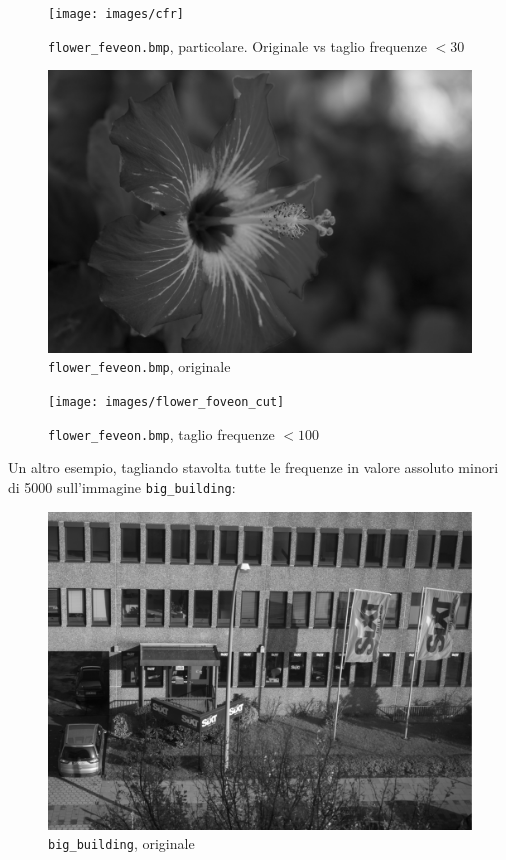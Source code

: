 \documentclass[11pt,a4paper]{scrartcl}
\begin{document}
\begin{figure}[!ht]
\centering
\texttt{[image: images/cfr]} 
\caption{\texttt{flower\_feveon.bmp}, particolare. Originale vs taglio frequenze $< 30$}
\end{figure}

\begin{figure}[!ht]
\centering
\includegraphics[scale=0.29]{images/flower_foveon} 
\caption{\texttt{flower\_feveon.bmp}, originale}
\end{figure}

\begin{figure}[!ht]
\centering
\texttt{[image: images/flower\_foveon\_cut]} 
\caption{\texttt{flower\_feveon.bmp}, taglio frequenze $< 100$}
\end{figure}

Un altro esempio, tagliando stavolta tutte le frequenze in valore assoluto minori di 5000 sull'immagine \texttt{big\_building}:

\begin{figure}[!ht]
\centering
\includegraphics[scale=0.29]{images/big_building} 
\caption{\texttt{big\_building}, originale}
\end{figure}
\end{document}
